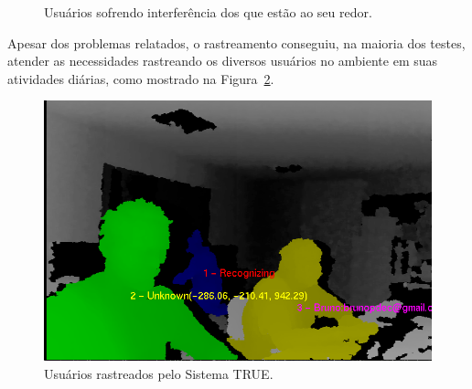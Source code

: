 		\begin{figure}[htb]
			\begin{center}
			\end{center}
			\caption{Usuários sofrendo interferência dos que estão ao seu redor.}
			\label{fig:testes_relacionamento_com_usuarios}
		\end{figure}

	Apesar dos problemas relatados, o rastreamento conseguiu, na maioria dos testes, atender as necessidades rastreando os diversos usuários no ambiente em suas atividades diárias, como mostrado na Figura~\ref{fig:varios-usuarios-ambiente}.

		\begin{figure}[htb]
			\begin{center}
				\includegraphics[scale=0.5]{figuras/5.Testes/oclusao/usuarios-rastreados.png}
			\end{center}
			\caption{Usuários rastreados pelo Sistema TRUE.}
			\label{fig:varios-usuarios-ambiente}
		\end{figure}
		
	